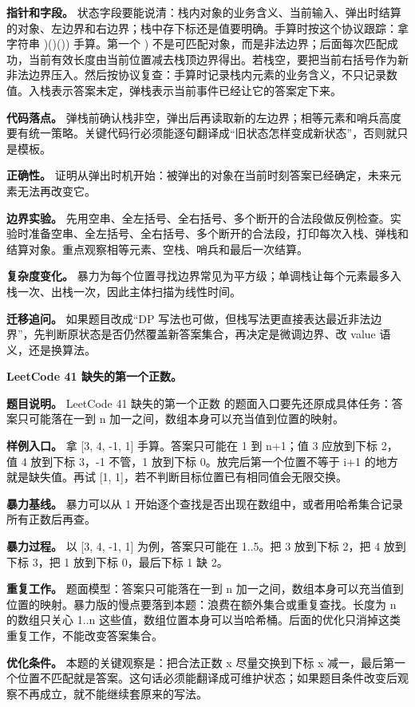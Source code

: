 \textbf{指针和字段。} 状态字段要能说清：栈内对象的业务含义、当前输入、弹出时结算的对象、左边界和右边界；栈中存下标还是值要明确。手算时按这个协议跟踪：拿字符串 )()()) 手算。第一个 ) 不是可匹配对象，而是非法边界；后面每次匹配成功，当前有效长度由当前位置减去栈顶边界得出。若栈空，要把当前右括号作为新非法边界压入。然后按协议复查：手算时记录栈内元素的业务含义，不只记录数值。入栈表示答案未定，弹栈表示当前事件已经让它的答案定下来。

\textbf{代码落点。} 弹栈前确认栈非空，弹出后再读取新的左边界；相等元素和哨兵高度要有统一策略。关键代码行必须能逐句翻译成“旧状态怎样变成新状态”，否则就只是模板。

\textbf{正确性。} 证明从弹出时机开始：被弹出的对象在当前时刻答案已经确定，未来元素无法再改变它。

\textbf{边界实验。} 先用空串、全左括号、全右括号、多个断开的合法段做反例检查。实验时准备空串、全左括号、全右括号、多个断开的合法段，打印每次入栈、弹栈和结算对象。重点观察相等元素、空栈、哨兵和最后一次结算。

\textbf{复杂度变化。} 暴力为每个位置寻找边界常见为平方级；单调栈让每个元素最多入栈一次、出栈一次，因此主体扫描为线性时间。

\textbf{迁移追问。} 如果题目改成“DP 写法也可做，但栈写法更直接表达最近非法边界”，先判断原状态是否仍然覆盖新答案集合，再决定是微调边界、改 value 语义，还是换算法。

\noindent\textbf{LeetCode 41 缺失的第一个正数。}

\textbf{题目说明。} LeetCode 41 缺失的第一个正数 的题面入口要先还原成具体任务：答案只可能落在一到 n 加一之间，数组本身可以充当值到位置的映射。

\textbf{样例入口。} 拿 [3, 4, -1, 1] 手算。答案只可能在 1 到 n+1；值 3 应放到下标 2，值 4 放到下标 3，-1 不管，1 放到下标 0。放完后第一个位置不等于 i+1 的地方就是缺失值。再试 [1, 1]，若不判断目标位置已有相同值会无限交换。

\textbf{暴力基线。} 暴力可以从 1 开始逐个查找是否出现在数组中，或者用哈希集合记录所有正数后再查。

\textbf{暴力过程。} 以 [3, 4, -1, 1] 为例，答案只可能在 1..5。把 3 放到下标 2，把 4 放到下标 3，把 1 放到下标 0，最后下标 1 缺 2。

\textbf{重复工作。} 题面模型：答案只可能落在一到 n 加一之间，数组本身可以充当值到位置的映射。暴力版的慢点要落到本题：浪费在额外集合或重复查找。长度为 n 的数组只关心 1..n 这些值，数组位置本身可以当哈希桶。后面的优化只消掉这类重复工作，不能改变答案集合。

\textbf{优化条件。} 本题的关键观察是：把合法正数 x 尽量交换到下标 x 减一，最后第一个位置不匹配就是答案。这句话必须能翻译成可维护状态；如果题目条件改变后观察不再成立，就不能继续套原来的写法。

